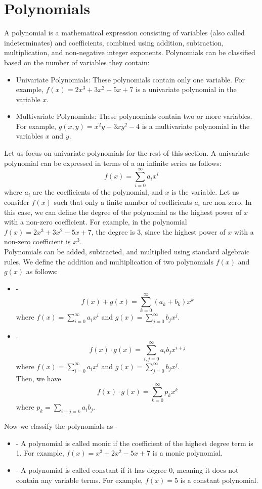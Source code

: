 \documentclass[openany]{book}
\begin{document}
\section{Polynomials}
A polynomial is a mathematical expression consisting of variables (also called indeterminates) and coefficients, combined using addition, subtraction, multiplication, and non-negative integer exponents. Polynomials can be classified based on the number of variables they contain:
\begin{itemize}
    \item Univariate Polynomials: These polynomials contain only one variable. For example, $f(x) = 2x^3 + 3x^2 - 5x + 7$ is a univariate polynomial in the variable $x$.
    \item Multivariate Polynomials: These polynomials contain two or more variables. For example, $g(x, y) = x^2y + 3xy^2 - 4$ is a multivariate polynomial in the variables $x$ and $y$.
\end{itemize}
Let us focus on univariate polynomials for the rest of this section. A univariate polynomial can be expressed in terms of a an infinite series as follows:
\[f(x) = \sum_{i=0}^\infty a_i x^i\]
where $a_i$ are the coefficients of the polynomial, and $x$ is the variable. Let us consider $f(x)$ such that only a finite number of coefficients $a_i$ are non-zero. In this case, we can define the degree of the polynomial as the highest power of $x$ with a non-zero coefficient. For example, in the polynomial $f(x) = 2x^3 + 3x^2 - 5x + 7$, the degree is 3, since the highest power of $x$ with a non-zero coefficient is $x^3$. \\
Polynomials can be added, subtracted, and multiplied using standard algebraic rules. \cite{Artin} We define the addition and multiplication of two polynomials $f(x)$ and $g(x)$ as follows:
\begin{itemize}
    \item {} - $$f(x) + g(x) = \sum_{k=0}^\infty (a_k + b_k) x^k$$ where $f(x) = \sum_{i=0}^\infty a_i x^i$ and $g(x) = \sum_{j=0}^\infty b_j x^j$.
    \item {} - $$f(x) \cdot g(x) = \sum_{i, j=0}^\infty a_i b_j x^{i+j}$$ where $f(x) = \sum_{i=0}^\infty a_i x^i$ and $g(x) = \sum_{j=0}^\infty b_j x^j$. \\
    Then, we have $$f(x) \cdot g(x) = \sum_{k=0}^\infty p_k x^k$$ where $p_k = \sum_{i+j=k} a_i b_j$.
\end{itemize}
Now we classify the polynomials as - 
\begin{itemize}
    \item {} - A polynomial is called monic if the coefficient of the highest degree term is 1. For example, $f(x) = x^3 + 2x^2 - 5x + 7$ is a monic polynomial.
    \item {} - A polynomial is called constant if it has degree 0, meaning it does not contain any variable terms. For example, $f(x) = 5$ is a constant polynomial.
\end{itemize}
\end{document}
